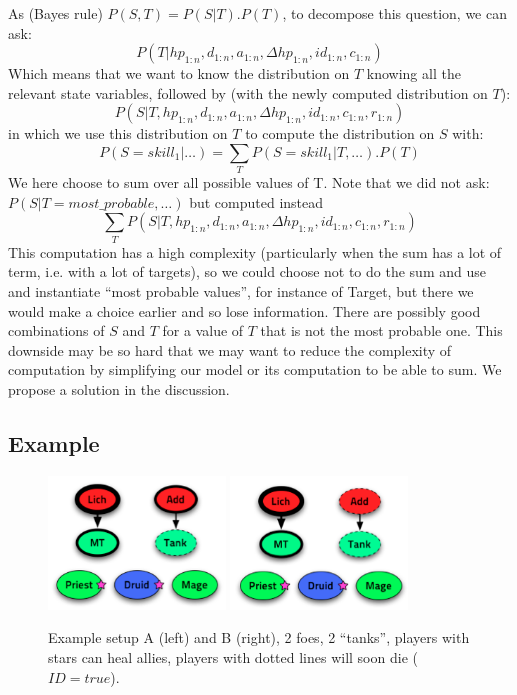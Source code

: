 As (Bayes rule) $P(S,T) = P(S|T).P(T)$, to decompose this question, we can ask:
$$P(T | hp_{1:n},d_{1:n}, a_{1:n}, \Delta hp_{1:n}, id_{1:n}, c_{1:n})$$ 
Which means that we want to know the distribution on $T$ knowing all the relevant state variables, followed by (with the newly computed distribution on $T$):
$$P(S | T, hp_{1:n},d_{1:n}, a_{1:n}, \Delta hp_{1:n}, id_{1:n}, c_{1:n}, r_{1:n})$$ 
in which we use this distribution on $T$ to compute the distribution on $S$ with:
$$P(S=skill_1 | \dots) = \sum_T P(S=skill_1 | T, \dots).P(T)$$
We here choose to sum over all possible values of T. Note that we did not ask:\\
$P(S|T=most\_probable , \dots)$ but computed instead
$$\sum_T P(S|T,hp_{1:n},d_{1:n}, a_{1:n}, \Delta hp_{1:n}, id_{1:n}, c_{1:n}, r_{1:n})$$
This computation has a high complexity (particularly when the sum has a lot of term, i.e. with a lot of targets), so we could choose not to do the sum and use and instantiate ``most probable values'', for instance of Target, but there we would make a choice earlier and so lose information. There are possibly good combinations of $S$ and $T$ for a value of $T$ that is not the most probable one. This downside may be so hard that we may want to reduce the complexity of computation by simplifying our model or its computation to be able to sum. We propose a solution in the discussion.

\subsection{Example}

\begin{figure}[h!]
\begin{center}
\includegraphics[width=4.7cm]{images/wow_fight1.png} \hspace{1cm} \includegraphics[width=4.7cm]{images/wow_fight2.png}
\caption{Example setup A (left) and B (right), 2 foes, 2 “tanks”, players with stars can heal allies, players with dotted lines will soon die ($ID=true$).}
\label{fig:wow_fight}
\end{center}
\end{figure}

